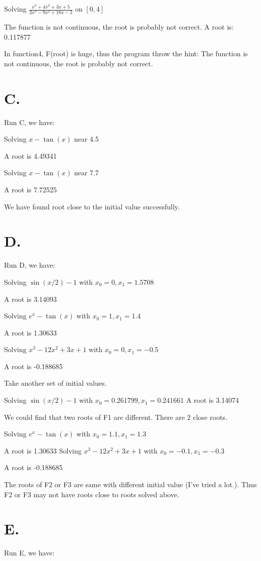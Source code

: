 \documentclass[a4paper]{article}
\begin{document}
Solving $\frac{x^{3}+4x^{2}+3x+5}{2x^{3}-9x^{2}+18x-2}$ on $[0,4]$

The function is not continuous, the root is probably not correct. 
A root is: 0.117877


In function4, F(root) is huge, thus the program throw the hint:
The function is not continuous, the root is probably not correct. 

\section*{C.}
Run C, we have:


Solving $x-\tan(x)$ near 4.5

A root is 4.49341

Solving $x-\tan(x)$ near 7.7

A root is 7.72525


We have found root close to the initial value successfully.

\section*{D.}
Run D, we have:


Solving $\sin(x/2)-1$ with $x_0=0, x_1=1.5708$

A root is 3.14093

Solving $e^{x}-\tan(x)$ with $x_0=1, x_1=1.4$

A root is 1.30633

Solving $x^{3}-12x^{2}+3x+1$ with $x_0=0, x_1=-0.5$

A root is -0.188685


Take another set of initial values.

Solving $\sin(x/2)-1$ with $x_0=0.261799, x_1=0.241661$
A root is 3.14074

We could find that two roots of F1 are different. There are 2 close roots.

Solving $e^{x}-\tan(x)$ with $x_0=1.1, x_1=1.3$

A root is 1.30633
Solving $x^{3}-12x^{2}+3x+1$ with $x_0=-0.1, x_1=-0.3$

A root is -0.188685

The roots of F2 or F3 are same with different initial value (I've tried a lot.). 
Thus F2 or F3 may not have roots close to roots solved above.

\section*{E.}
Run E, we have:
\end{document}
